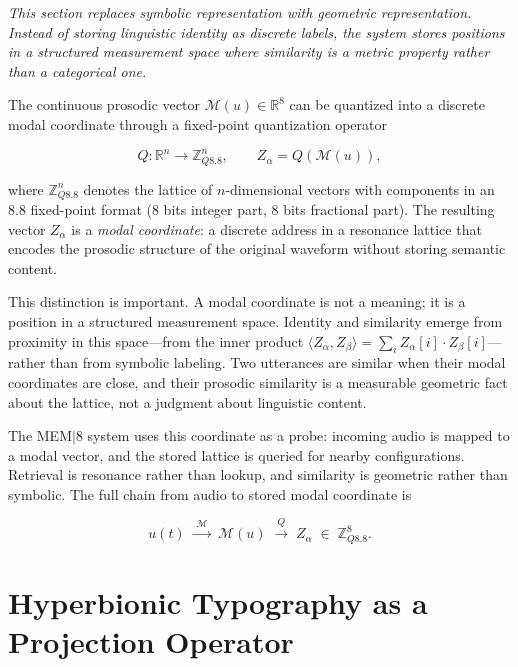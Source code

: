 \documentclass[12pt, a4paper]{article}
\begin{document}
\noindent\textit{This section replaces symbolic representation with geometric representation. Instead of storing linguistic identity as discrete labels, the system stores positions in a structured measurement space where similarity is a metric property rather than a categorical one.}


The continuous prosodic vector $\mathcal{M}(u) \in \mathbb{R}^8$ can be quantized into a discrete modal coordinate through a fixed-point quantization operator

\begin{equation}
Q : \mathbb{R}^n \to \mathbb{Z}_{Q8.8}^n,
\qquad
Z_\alpha = Q(\mathcal{M}(u)),
\label{eq:Q}
\end{equation}

where $\mathbb{Z}_{Q8.8}^n$ denotes the lattice of $n$-dimensional vectors with components in an 8.8 fixed-point format (8 bits integer part, 8 bits fractional part). The resulting vector $Z_\alpha$ is a \emph{modal coordinate}: a discrete address in a resonance lattice that encodes the prosodic structure of the original waveform without storing semantic content.

This distinction is important. A modal coordinate is not a meaning; it is a position in a structured measurement space. Identity and similarity emerge from proximity in this space---from the inner product $\langle Z_\alpha, Z_\beta \rangle = \sum_i Z_\alpha[i] \cdot Z_\beta[i]$---rather than from symbolic labeling. Two utterances are similar when their modal coordinates are close, and their prosodic similarity is a measurable geometric fact about the lattice, not a judgment about linguistic content.

The MEM$|$8 system uses this coordinate as a probe: incoming audio is mapped to a modal vector, and the stored lattice is queried for nearby configurations. Retrieval is resonance rather than lookup, and similarity is geometric rather than symbolic. The full chain from audio to stored modal coordinate is

\begin{equation}
u(t) \;\xrightarrow{\;\mathcal{M}\;}\; \mathcal{M}(u) \;\xrightarrow{\;Q\;}\; Z_\alpha \;\in\; \mathbb{Z}_{Q8.8}^8.
\label{eq:chain}
\end{equation}

\section{Hyperbionic Typography as a Projection Operator}
\end{document}
